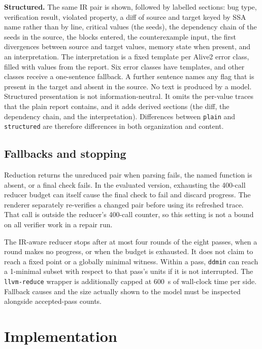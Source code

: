 \documentclass[conference]{IEEEtran}
\newcommand{\cn}[1]{\texttt{#1}}   %
\begin{document}
\textbf{Structured.} The same IR pair is shown, followed by labelled sections: bug type, verification result, violated property, a diff of source and target keyed by SSA name rather than by line, critical values (the seeds), the dependency chain of the seeds in the source, the blocks entered, the counterexample input, the first divergences between source and target values, memory state when present, and an interpretation. The interpretation is a fixed template per Alive2 error class, filled with values from the report. Six error classes have templates, and other classes receive a one-sentence fallback. A further sentence names any flag that is present in the target and absent in the source. No text is produced by a model. Structured presentation is not information-neutral. It omits the per-value traces that the plain report contains, and it adds derived sections (the diff, the dependency chain, and the interpretation). Differences between \cn{plain} and \cn{structured} are therefore differences in both organization and content.

\subsection{Fallbacks and stopping}

Reduction returns the unreduced pair when parsing fails, the named function is absent, or a final check fails. In the evaluated version, exhausting the 400-call reducer budget can itself cause the final check to fail and discard progress. The renderer separately re-verifies a changed pair before using its refreshed trace. That call is outside the reducer's 400-call counter, so this setting is not a bound on all verifier work in a repair run.

The IR-aware reducer stops after at most four rounds of the eight passes, when a round makes no progress, or when the budget is exhausted. It does not claim to reach a fixed point or a globally minimal witness. Within a pass, \texttt{ddmin} can reach a 1-minimal subset with respect to that pass's units if it is not interrupted. The \texttt{llvm-reduce} wrapper is additionally capped at 600~s of wall-clock time per side. Fallback causes and the size actually shown to the model must be inspected alongside accepted-pass counts.

\section{Implementation}
\label{sec:impl}
\end{document}
